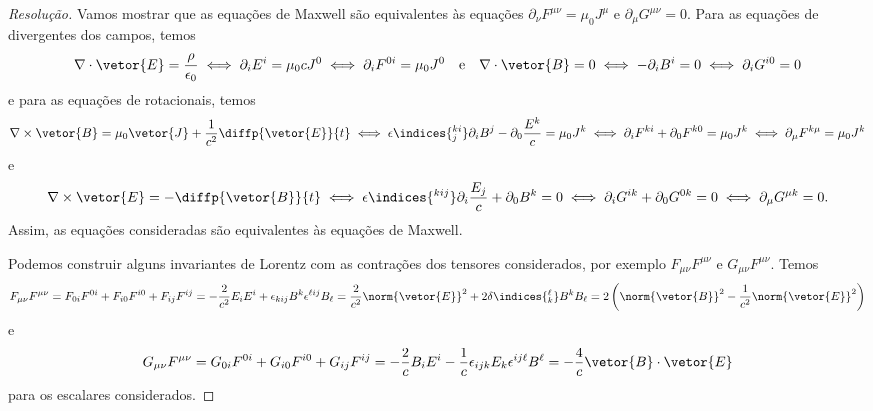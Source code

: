 \begin{proof}[Resolução]
   Vamos mostrar que as equações de Maxwell são equivalentes às equações \(\partial_\nu F^{\mu\nu} = \mu_0 J^\mu\) e \(\partial_\mu G^{\mu\nu} = 0.\) Para as equações de divergentes dos campos, temos
   \begin{equation*}
      \nabla \cdot \vetor{E} = \frac{\rho}{\epsilon_0} \iff \partial_i E^i = \mu_0 c J^0 \iff \partial_i F^{0i} = \mu_0 J^0
      \quad\text{e}\quad
      \nabla\cdot \vetor{B} = 0 \iff -\partial_i B^i = 0 \iff \partial_i G^{i0} = 0
   \end{equation*}
   e para as equações de rotacionais, temos
   \begin{equation*}
      \nabla \times \vetor{B} = \mu_0 \vetor{J} + \frac{1}{c^2} \diffp{\vetor{E}}{t} \iff \epsilon\indices{^{ki}_j} \partial_i B^j - \partial_0 \frac{E^k}{c} = \mu_0 J^k \iff \partial_i F^{ki} + \partial_0 F^{k0} = \mu_0 J^k \iff \partial_\mu F^{k\mu} = \mu_0 J^k
   \end{equation*}
   e
   \begin{equation*}
      \nabla\times \vetor{E} = - \diffp{\vetor{B}}{t} \iff \epsilon\indices{^{kij}} \partial_i \frac{E_j}{c} + \partial_0 B^k = 0 \iff \partial_i G^{ik} + \partial_0 G^{0k} = 0 \iff \partial_\mu G^{\mu k} = 0.
   \end{equation*}
   Assim, as equações consideradas são equivalentes às equações de Maxwell.

   Podemos construir alguns invariantes de Lorentz com as contrações dos tensores considerados, por exemplo \(F_{\mu\nu}F^{\mu\nu}\) e \(G_{\mu\nu} F^{\mu\nu}.\) Temos
   \begin{equation*}
      F_{\mu\nu} F^{\mu\nu} = F_{0i} F^{0i} + F_{i0}F^{i0} + F_{ij}F^{ij} = -\frac{2}{c^2} E_i E^i + \epsilon_{kij} B^k \epsilon^{\ell ij} B_{\ell} = \frac{2}{c^2} \norm{\vetor{E}}^2 + 2 \delta\indices{^\ell_k} B^k B_{\ell} = 2\left(\norm{\vetor{B}}^2 - \frac1{c^2} \norm{\vetor{E}}^2\right)
   \end{equation*}
   e
   \begin{equation*}
      G_{\mu\nu} F^{\mu\nu} = G_{0i}F^{0i} + G_{i0} F^{i0} + G_{ij}F^{ij} = -\frac{2}{c} B_i E^i - \frac1c\epsilon_{ijk} E_k \epsilon^{ij\ell} B^\ell = -\frac4c \vetor{B} \cdot \vetor{E}
   \end{equation*}
   para os escalares considerados.
\end{proof}
